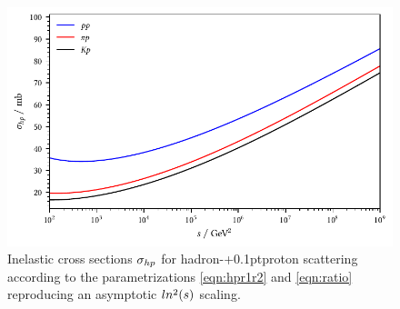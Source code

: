 \begin{figure}[H]
	\centering
	\includegraphics{../plots/build/hadron_proton_scattering.pdf}
	\caption[Inelastic cross sections $\sigma_{h \kern-0.1pt p}$ for hadron-{\kern+0.1pt}proton scattering.]{Inelastic cross sections
			 $\sigma_{h \kern-0.1pt p}$ for hadron-{\kern+0.1pt}proton scattering according to the parametrizations \eqref{eqn:hpr1r2}
			 and \eqref{eqn:ratio} reproducing an asymptotic $\cramped{ln^2(s)}$ scaling.}
	\label{fig:hadron-proton-scattering}
\end{figure}
